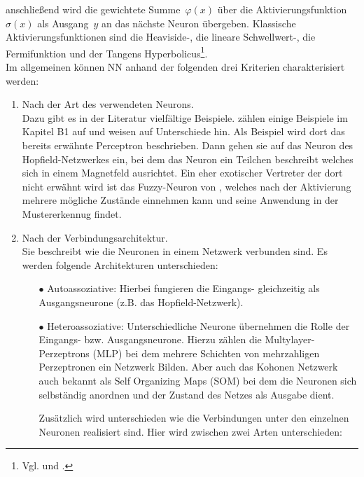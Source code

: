 anschließend wird die gewichtete Summe~$\varphi(x)$ über die Aktivierungsfunktion~$\sigma(x)$ als Ausgang~$y$ an das nächste Neuron übergeben. Klassische Aktivierungsfunktionen sind die \hbox{Heaviside-,} die lineare Schwellwert-, die Fermifunktion und der Tangens Hyperbolicus\footnote{Vgl. \citet[5]{neuralnet_intro} und \citet[39 f]{dkriesel07}.}.\\
Im allgemeinen können NN anhand der folgenden drei Kriterien charakterisiert werden:%

\begin{enumerate}
\item%
Nach der Art des verwendeten Neurons.\\
Dazu gibt es in der Literatur vielfältige Beispiele. \citet{Fiesler96} zählen einige Beispiele im Kapitel B1 auf und weisen auf Unterschiede hin. Als Beispiel wird dort das bereits erwähnte Perceptron beschrieben. Dann gehen sie auf das Neuron des Hopfield-Netzwerkes ein, bei dem das Neuron ein Teilchen beschreibt welches sich in einem Magnetfeld ausrichtet. Ein eher exotischer Vertreter der dort nicht erwähnt wird ist das Fuzzy-Neuron von \citet{fuzzy-neuron}, welches nach der Aktivierung mehrere mögliche Zustände einnehmen kann und seine Anwendung in der Mustererkennug findet.

\item%
Nach der Verbindungsarchitektur.\\
Sie beschreibt wie die Neuronen in einem Netzwerk verbunden sind.
Es werden folgende Architekturen unterschieden:
\begin{itemize}
\item[\textbf{$\bullet$}]%
Autoassoziative: Hierbei fungieren die Eingangs- gleichzeitig als Ausgangsneurone (z.B. das Hopfield-Netzwerk). 

\item[\textbf{$\bullet$}]%
Heteroassoziative: Unterschiedliche Neurone übernehmen die Rolle der Eingangs- bzw. Ausgangsneurone. Hierzu zählen die Multylayer-Perzeptrons (MLP) bei dem mehrere Schichten von mehrzahligen Perzeptronen ein Netzwerk Bilden. Aber auch das Kohonen Netzwerk auch bekannt als Self Organizing Maps (SOM) bei dem die Neuronen sich selbständig anordnen und der Zustand des Netzes als Ausgabe dient.

Zusätzlich wird unterschieden wie die Verbindungen unter den einzelnen Neuronen realisiert sind. Hier wird zwischen zwei Arten unterschieden:


\end{itemize}
\end{enumerate}
